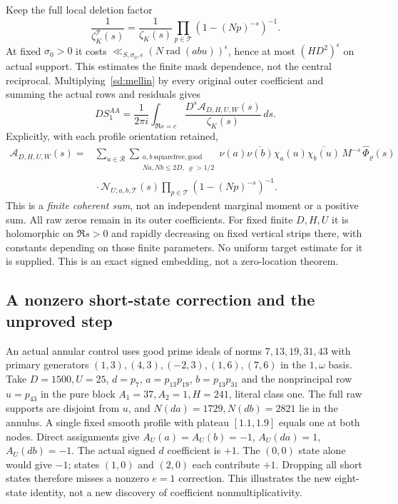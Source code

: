 Keep the full local deletion factor
\[
 \frac1{\zeta_K^{\mathcal T}(s)}=
 \frac1{\zeta_K(s)}\prod_{p\in\mathcal T}(1-(Np)^{-s})^{-1}.
\]
At fixed $\sigma_0>0$ it costs
$\ll_{S,\sigma_0,\epsilon}(N\operatorname{rad}(abu))^\epsilon$,
hence at most $(HD^2)^\epsilon$ on actual support.
This estimates the finite mask dependence, not the central reciprocal.
Multiplying~\eqref{sd:mellin} by every original outer coefficient and
summing the actual rows and residuals gives
\begin{equation}\label{sd:coherent}
 DS_1^{AA}=\frac1{2\pi i}\int_{\Re s=c}
                   \frac{D^s\mathcal A_{D,H,U,W}(s)}{\zeta_K(s)}\,ds.
\end{equation}
Explicitly, with each profile orientation retained,
\[
 \begin{split}
 \mathcal A_{D,H,U,W}(s)
 ={}&\sum_{u\in\mathcal R}
 \sum_{\substack{a,b\ \mathrm{squarefree,good}\\Na,Nb\le2D,\ \varrho>1/2}}
 \nu(a)\overline{\nu(b)}\chi_a(u)\overline{\chi_b(u)}\,M^{-s}\,\widehat\Phi_\varrho(s)\\
 &{}\cdot\mathcal N_{U;a,b,\mathcal T}(s)
       \prod_{p\in\mathcal T}(1-(Np)^{-s})^{-1}.
 \end{split}
\]
This is a \emph{finite coherent sum}, not an independent marginal
moment or a positive sum. All raw zeros remain in its outer coefficients.
For fixed finite $D,H,U$ it is holomorphic on $\Re s>0$ and rapidly
decreasing on fixed vertical strips there, with constants depending on
those finite parameters. No uniform target estimate for it is supplied.
This is an exact signed embedding, not a zero-location theorem.

\subsection{A nonzero short-state correction and the unproved step}
An actual annular control uses good prime ideals of norms
$7,13,19,31,43$ with primary generators
$(1,3),(4,3),(-2,3),(1,6),(7,6)$ in the $1,\omega$ basis.
Take $D=1500,U=25$, $d=p_7$, $a=p_{13}p_{19}$,
$b=p_{13}p_{31}$ and the nonprincipal row $u=p_{43}$ in the pure block
$A_1=37,A_2=1,H=241$, literal class one.
The full raw supports are disjoint from $u$, and
$N(da)=1729,N(db)=2821$ lie in the annulus. A single fixed smooth
profile with plateau $[1.1,1.9]$ equals one at both nodes.
Direct assignments give
$A_U(a)=A_U(b)=-1$, $A_U(da)=1$, $A_U(db)=-1$.
The actual signed $d$ coefficient is $+1$. The $(0,0)$ state alone
would give $-1$; states $(1,0)$ and $(2,0)$ each contribute $+1$.
Dropping all short states therefore misses a nonzero $e=1$ correction.
This illustrates the new eight-state identity, not a new discovery of
coefficient nonmultiplicativity.

